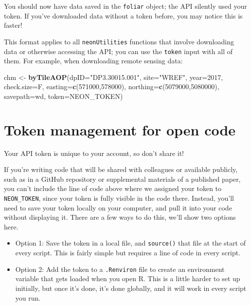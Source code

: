 \documentclass[]{book}
\newenvironment{Shaded}{\begin{snugshade}}{\end{snugshade}}
\newcommand{\DataTypeTok}[1]{\textcolor[rgb]{0.13,0.29,0.53}{#1}}
\newcommand{\DecValTok}[1]{\textcolor[rgb]{0.00,0.00,0.81}{#1}}
\newcommand{\KeywordTok}[1]{\textcolor[rgb]{0.13,0.29,0.53}{\textbf{#1}}}
\newcommand{\NormalTok}[1]{#1}
\newcommand{\StringTok}[1]{\textcolor[rgb]{0.31,0.60,0.02}{#1}}
\begin{document}
You should now have data saved in the \texttt{foliar} object; the API
silently used your token. If you've downloaded data without a
token before, you may notice this is faster!

This format applies to all \texttt{neonUtilities} functions that involve
downloading data or otherwise accessing the API; you can use the
\texttt{token} input with all of them. For example, when downloading
remote sensing data:

\begin{Shaded}
\begin{Highlighting}[]
\NormalTok{chm <-}\StringTok{ }\KeywordTok{byTileAOP}\NormalTok{(}\DataTypeTok{dpID=}\StringTok{"DP3.30015.001"}\NormalTok{, }\DataTypeTok{site=}\StringTok{"WREF"}\NormalTok{, }
                 \DataTypeTok{year=}\DecValTok{2017}\NormalTok{, }\DataTypeTok{check.size=}\NormalTok{F,}
                 \DataTypeTok{easting=}\KeywordTok{c}\NormalTok{(}\DecValTok{571000}\NormalTok{,}\DecValTok{578000}\NormalTok{), }
                 \DataTypeTok{northing=}\KeywordTok{c}\NormalTok{(}\DecValTok{5079000}\NormalTok{,}\DecValTok{5080000}\NormalTok{), }
                 \DataTypeTok{savepath=}\NormalTok{wd,}
                 \DataTypeTok{token=}\NormalTok{NEON_TOKEN)}
\end{Highlighting}
\end{Shaded}

\hypertarget{token-management-for-open-code}{%
\section{Token management for open code}\label{token-management-for-open-code}}

Your API token is unique to your account, so don't share it!

If you're writing code that will be shared with colleagues or available
publicly, such as in a GitHub repository or supplemental materials of a
published paper, you can't include the line of code above where we assigned
your token to \texttt{NEON\_TOKEN}, since your token is fully visible in the code
there. Instead, you'll need to save your token locally on your computer,
and pull it into your code without displaying it. There are a few ways to
do this, we'll show two options here.

\begin{itemize}
\item
  Option 1: Save the token in a local file, and \texttt{source()} that file at the
  start of every script. This is fairly simple but requires a line of code in
  every script.
\item
  Option 2: Add the token to a \texttt{.Renviron} file to create an environment
  variable that gets loaded when you open R. This is a little harder to set
  up initially, but once it's done, it's done globally, and it will work in
  every script you run.
\end{itemize}
\end{document}

